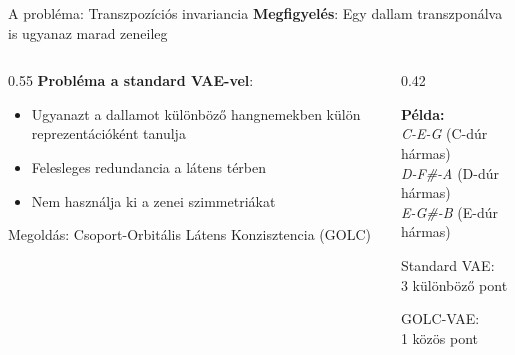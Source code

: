 \documentclass[aspectratio=169]{beamer}
\begin{document}
\begin{frame}{A probléma: Transzpozíciós invariancia}
\textbf{Megfigyelés}: Egy dallam transzponálva is ugyanaz marad zeneileg

\vspace{0.5em}
\begin{columns}[T]
\begin{column}{0.55\textwidth}
\textbf{Probléma a standard VAE-vel}:
\begin{itemize}
    \item Ugyanazt a dallamot különböző hangnemekben külön reprezentációként tanulja
    \item Felesleges redundancia a látens térben
    \item Nem használja ki a zenei szimmetriákat
\end{itemize}

\vspace{0.5em}
\alert{Megoldás: Csoport-Orbitális Látens Konzisztencia (GOLC)}
\end{column}

\begin{column}{0.42\textwidth}
\vspace{-0.5em}
\begin{center}
\textbf{Példa:}\\
\vspace{0.3em}
\textit{C-E-G} (C-dúr hármas)\\
\textit{D-F\#-A} (D-dúr hármas)\\
\textit{E-G\#-B} (E-dúr hármas)

\vspace{0.5em}

\vspace{0.3em}
Standard VAE:\\3 különböző pont

\vspace{0.5em}

\vspace{0.3em}
GOLC-VAE:\\1 közös pont
\end{center}
\end{column}
\end{columns}
\end{frame}
\end{document}
